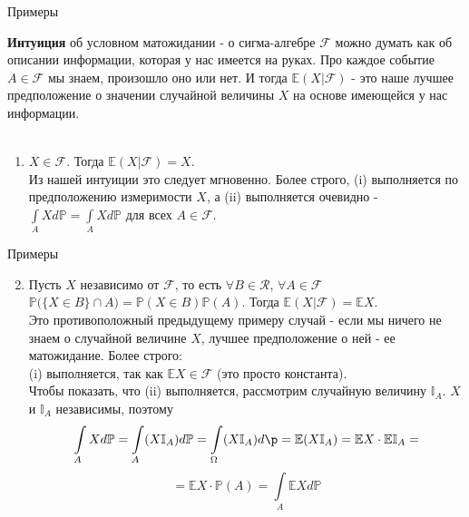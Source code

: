 \documentclass{beamer}%
\theoremstyle{definition}
\renewcommand{\P}{\mathbb{P}}
\newcommand{\F}{\mathcal{F}}
\begin{document}
\begin{frame}{Примеры}

\textbf{Интуиция} об условном матожидании - о сигма-алгебре $\F$ можно думать как об описании информации, которая у нас имеется на руках. Про каждое событие $A\in\F$ мы знаем, произошло оно или нет. И тогда $\mathbb{E}(X|\F)$ - это наше лучшее предположение о значении случайной величины $X$ на основе имеющейся у нас информации.
\\
\\
\begin{enumerate}
\item $X\in\F$. Тогда $\mathbb{E}(X|\F)=X$.
\\
Из нашей интуиции это следует мгновенно. Более строго, (i) выполняется по предположению измеримости $X$, а (ii) выполняется очевидно - $\int\limits_AXd\P=\int\limits_AXd\P$ для всех $A\in\F$.
\end{enumerate}


\end{frame}


\begin{frame}{Примеры}

\begin{enumerate}
\setcounter{enumi}{1}
\item Пусть $X$ независимо от $\F$, то есть $\forall B\in\mathcal{R}$, $\forall A\in\F$ $\P\big(\{X\in B\}\cap A\big)=\P(X\in B)\P(A)$. Тогда $\mathbb{E}(X|\F)=\mathbb{E}X$.
\\
Это противоположный предыдущему примеру случай - если мы ничего не знаем о случайной величине $X$, лучшее предположение о ней - ее матожидание. Более строго:
\\
(i) выполняется, так как $\mathbb{E}X\in\F$ (это просто константа).
\\
Чтобы показать, что (ii) выполняется, рассмотрим случайную величину $\mathbb{I}_A$. $X$ и $\mathbb{I}_A$ независимы, поэтому
$$\int\limits_AXd\P=\int\limits_A(X\mathbb{I}_A)d\P=\int\limits_\Omega(X\mathbb{I}_A)d\p=\mathbb{E}(X\mathbb{I}_A)=\mathbb{E}X\cdot\mathbb{E}\mathbb{I}_A=$$
$$=\mathbb{E}X\cdot\P(A)=\int\limits_A\mathbb{E}Xd\P$$
\end{enumerate}

\end{frame}
\end{document}
